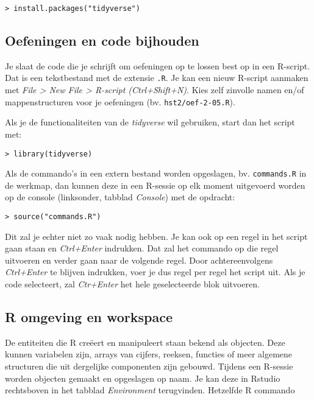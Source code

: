 \begin{lstlisting}
> install.packages("tidyverse")
\end{lstlisting}

\subsection{Oefeningen en code bijhouden}

Je slaat de code die je schrijft om oefeningen op te lossen best op in een R-script. Dat is een tekstbestand met de extensie \texttt{.R}. Je kan een nieuw R-script aanmaken met \textit{File > New File > R-script (Ctrl+Shift+N)}. Kies zelf zinvolle namen en/of mappenstructuren voor je oefeningen (bv. \texttt{hst2/oef-2-05.R}).

Als je de functionaliteiten van de \textit{tidyverse} wil gebruiken, start dan het script met:

\begin{lstlisting}
> library(tidyverse)
\end{lstlisting}

Als de commando's in een extern bestand worden opgeslagen, bv. \texttt{commands.R} in de werkmap, dan kunnen deze in een R-sessie op elk moment uitgevoerd worden op de console (linksonder, tabblad \textit{Console}) met de opdracht:

\begin{lstlisting}
> source("commands.R")
\end{lstlisting}

Dit zal je echter niet zo vaak nodig hebben. Je kan ook op een regel in het script gaan staan en \textit{Ctrl+Enter} indrukken. Dat zal het commando op die regel uitvoeren en verder gaan naar de volgende regel. Door achtereenvolgens \textit{Ctrl+Enter} te blijven indrukken, voer je dus regel per regel het script uit. Als je code selecteert, zal \textit{Ctr+Enter} het hele geselecteerde blok uitvoeren.

\subsection{R omgeving en workspace}

De entiteiten die R cre\"eert en manipuleert staan bekend als objecten. Deze kunnen variabelen zijn, arrays van cijfers, reeksen, functies of meer algemene structuren die uit dergelijke componenten zijn gebouwd. Tijdens een R-sessie worden objecten gemaakt en opgeslagen op naam. Je kan deze in Rstudio rechtsboven in het tabblad \textit{Environment} terugvinden. Hetzelfde R commando

